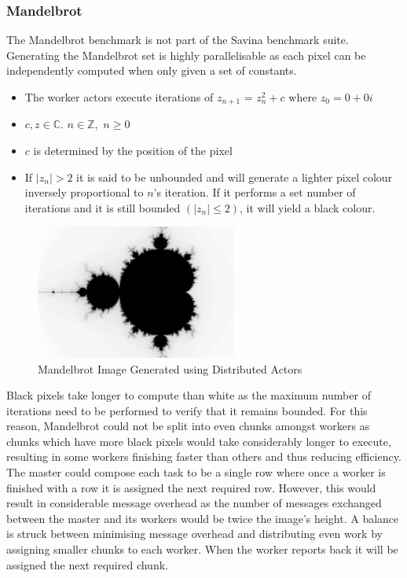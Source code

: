 \documentclass[12pt, a4paper]{report}
\theoremstyle{definition}
\theoremstyle{definition}%
\theoremstyle{definition}%
\theoremstyle{definition}%
\theoremstyle{definition}%
\theoremstyle{definition}%
\begin{document}
\subsubsection{Mandelbrot}
The Mandelbrot benchmark is not part of the Savina benchmark suite. Generating the Mandelbrot set is highly parallelisable as each pixel can be independently computed when only given a set of constants. 
\begin{itemize}
    \item The worker actors execute iterations of $z_{n+1}$ = $z_{n}^{2}+c$ where $z_0 = 0 + 0i$
    \item $c, z \in \mathbb{C}$. $n \in \mathbb{Z},$ $n \ge 0$
    \item $c$ is determined by the position of the pixel
    \item If $|z_n|> 2$ it is said to be unbounded and will generate a lighter pixel colour inversely proportional to $n$’s iteration. If it performs a set number of iterations and it is still bounded $(|z_n| \le 2)$, it will yield a black colour.
\end{itemize}
\begin{figure}[H]
    \begin{centering}
        \includegraphics[width=250px]{resources/mandelbrot.png}
        \caption{Mandelbrot Image Generated using Distributed Actors}
    \end{centering}
\end{figure}
Black pixels take longer to compute than white as the maximum number of iterations need to be performed to verify that it remains bounded. For this reason, Mandelbrot could not be split into even chunks amongst workers as chunks which have more black pixels would take considerably longer to execute, resulting in some workers finishing faster than others and thus reducing efficiency. The master could compose each task to be a single row where once a worker is finished with a row it is assigned the next required row. However, this would result in considerable message overhead as the number of messages exchanged between the master and its workers would be twice the image’s height. A balance is struck between minimising message overhead and distributing even work by assigning smaller chunks to each worker. When the worker reports back it will be assigned the next required chunk.
\end{document}
